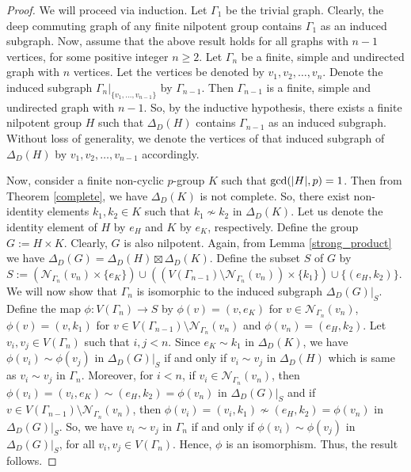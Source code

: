 \documentclass[12pt,a4paper]{article}
\begin{document}
\begin{proof}
We will proceed via induction. Let $\Gamma_1$ be the trivial graph. Clearly, the deep commuting graph of any finite nilpotent group contains $\Gamma_1$ as an induced subgraph. Now, assume that the above result holds for all graphs with $n-1$ vertices, for some positive integer $n\geq 2$. Let $\Gamma_{n}$ be a finite, simple and undirected graph with $n$ vertices. Let the vertices be denoted by $v_1,v_2,\dots,v_n$. Denote the induced subgraph $\Gamma_n\vert_{\{v_1,\dots,v_{n-1}\}}$ by $\Gamma_{n-1}$. Then $\Gamma_{n-1}$ is a finite, simple and undirected graph with $n-1$. So, by the inductive hypothesis, there exists a finite nilpotent group $H$ such that $\Delta_D(H)$ contains $\Gamma_{n-1}$ as an induced subgraph. Without loss of generality, we denote the vertices of that induced subgraph of $\Delta_D(H)$ by $v_1,v_2,\dots,v_{n-1}$ accordingly.   

Now, consider a finite non-cyclic $p$-group $K$ such that ${\rm gcd}(\lvert H\rvert,p)=1$. Then from Theorem \ref{complete}, we have $\Delta_D(K)$ is not complete. So, there exist non-identity elements $k_1,k_2\in K$ such that $k_1\nsim k_2$ in $\Delta_D(K)$. Let us denote the identity element of $H$ by $e_H$ and $K$ by $e_K$, respectively. Define the group $G:=H\times K$. Clearly, $G$ is also nilpotent. Again, from Lemma \ref{strong_product} we have $\Delta_D(G)=\Delta_D(H)\boxtimes\Delta_D(K)$. Define the subset $S$ of $G$ by $S:=(\mathcal{N}_{\Gamma_n}(v_n)\times\{e_K\})\cup((V(\Gamma_{n-1})\setminus\mathcal{N}_{\Gamma_n}(v_n))\times\{k_1\})\cup\{(e_H,k_2)\}$. We will now show that $\Gamma_n$ is isomorphic to the induced subgraph $\Delta_D(G)\vert_S$. Define the map $\phi:V(\Gamma_n)\rightarrow S$ by $\phi(v)=(v,e_K)$ for $v\in\mathcal{N}_{\Gamma_n}(v_n)$, $\phi(v)=(v,k_1)$ for $v\in V(\Gamma_{n-1})\setminus\mathcal{N}_{\Gamma_n}(v_n)$ and $\phi(v_n)=(e_H,k_2)$. Let $v_i,v_j\in V(\Gamma_n)$ such that $i,j<n$. Since $e_K\sim k_1$ in $\Delta_D(K)$, we have $\phi(v_i)\sim\phi(v_j)$ in $\Delta_D(G)\vert_{S}$ if and only if $v_i\sim v_j$ in $\Delta_D(H)$ which is same as $v_i\sim v_j$ in $\Gamma_n$. Moreover, for $i<n$, if $v_i\in\mathcal{N}_{\Gamma_n}(v_n)$, then $\phi(v_i)=(v_i,e_K)\sim(e_H,k_2)=\phi(v_n)$ in $\Delta_D(G)\vert_{S}$ and if $v\in V(\Gamma_{n-1})\setminus\mathcal{N}_{\Gamma_n}(v_n)$, then $\phi(v_i)=(v_i,k_1)\nsim(e_H,k_2)=\phi(v_n)$ in $\Delta_D(G)\vert_{S}$. So, we have $v_i\sim v_j$ in $\Gamma_n$ if and only if $\phi(v_i)\sim\phi(v_j)$ in $\Delta_D(G)\vert_{S}$, for all $v_i,v_j\in V(\Gamma_n)$. Hence, $\phi$ is an isomorphism. Thus, the result follows.
\end{proof}
\end{document}
